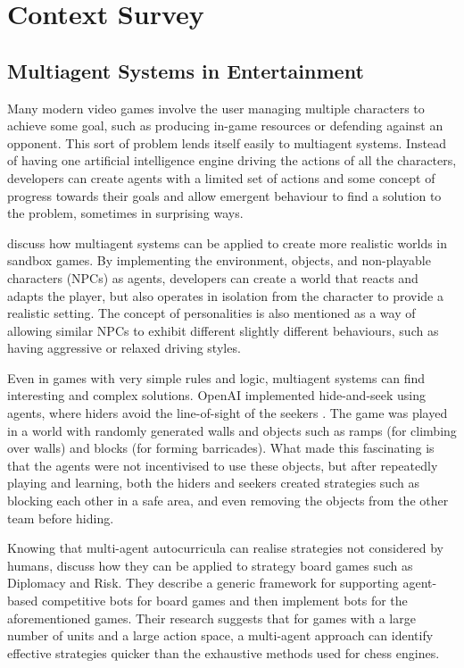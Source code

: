 \documentclass{article}
\begin{document}
\section{Context Survey}

\subsection{Multiagent Systems in Entertainment}

Many modern video games involve the user managing multiple characters to achieve some goal, such as producing in-game resources or defending against an opponent. This sort of problem lends itself easily to multiagent systems. Instead of having one artificial intelligence engine driving the actions of all the characters, developers can create agents with a limited set of actions and some concept of progress towards their goals and allow emergent behaviour to find a solution to the problem, sometimes in surprising ways. 

\cite{sandboxmas} discuss how multiagent systems can be applied to create more realistic worlds in sandbox games. By implementing the environment, objects, and non-playable characters (NPCs) as agents, developers can create a world that reacts and adapts the player, but also operates in isolation from the character to provide a realistic setting. The concept of personalities is also mentioned as a way of allowing similar NPCs to exhibit different slightly different behaviours, such as having aggressive or relaxed driving styles.

Even in games with very simple rules and logic, multiagent systems can find interesting and complex solutions. OpenAI implemented hide-and-seek using agents, where hiders avoid the line-of-sight of the seekers \cite{openaiemergent}. The game was played in a world with randomly generated walls and objects such as ramps (for climbing over walls) and blocks (for forming barricades). What made this fascinating is that the agents were not incentivised to use these objects, but after repeatedly playing and learning, both the hiders and seekers created strategies such as blocking each other in a safe area, and even removing the objects from the other team before hiding.

Knowing that multi-agent autocurricula can realise strategies not considered by humans, \cite{masboardgames} discuss how they can be applied to strategy board games such as Diplomacy and Risk. They describe a generic framework for supporting agent-based competitive bots for board games and then implement bots for the aforementioned games. Their research suggests that for games with a large number of units and a large action space, a multi-agent approach can identify effective strategies quicker than the exhaustive methods used for chess engines. 
\end{document}

